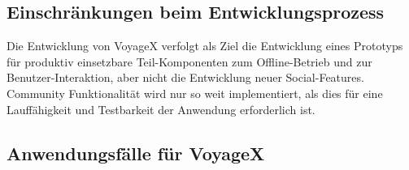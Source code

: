 \subsection{Einschränkungen beim Entwicklungsprozess}\label{4_ES}
Die Entwicklung von VoyageX verfolgt als Ziel die Entwicklung eines Prototyps für produktiv einsetzbare Teil-Komponenten zum Offline-Betrieb und zur Benutzer-Interaktion, aber nicht die Entwicklung neuer Social-Features. Community Funktionalität wird nur so weit implementiert, als dies für eine Lauffähigkeit und Testbarkeit der Anwendung erforderlich ist.


\subsection{Anwendungsfälle für VoyageX}\label{4_UC}


